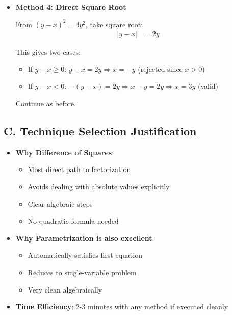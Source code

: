 \documentclass[12pt]{article}
\begin{document}
\begin{techniquesbox}
\begin{itemize}[leftmargin=*]
    Since $x > 0$, we have $x = 3y$. Continue as in Method 1.
    
    \item \textbf{Method 4: Direct Square Root}
    
    From $(y-x)^2 = 4y^2$, take square root:
    \begin{align*}
    |y-x| &= 2y
    \end{align*}
    
    This gives two cases:
    \begin{itemize}
        \item If $y - x \geq 0$: $y - x = 2y \Rightarrow x = -y$ (rejected since $x > 0$)
        \item If $y - x < 0$: $-(y-x) = 2y \Rightarrow x - y = 2y \Rightarrow x = 3y$ (valid)
    \end{itemize}
    
    Continue as before.
\end{itemize}

\subsection*{C. Technique Selection Justification}
\begin{itemize}[leftmargin=*]
    \item \textbf{Why Difference of Squares}: 
    \begin{itemize}
        \item Most direct path to factorization
        \item Avoids dealing with absolute values explicitly
        \item Clear algebraic steps
        \item No quadratic formula needed
    \end{itemize}
    \item \textbf{Why Parametrization is also excellent}:
    \begin{itemize}
        \item Automatically satisfies first equation
        \item Reduces to single-variable problem
        \item Very clean algebraically
    \end{itemize}
    \item \textbf{Time Efficiency}: 2-3 minutes with any method if executed cleanly
\end{itemize}
\end{techniquesbox}
\end{document}
